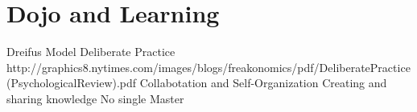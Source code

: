 \section{Dojo and Learning}\label{sec:learning}

Dreifus Model
Deliberate Practice
	http://graphics8.nytimes.com/images/blogs/freakonomics/pdf/DeliberatePractice(PsychologicalReview).pdf
Collabotation and Self-Organization
Creating and sharing knowledge
No single Master